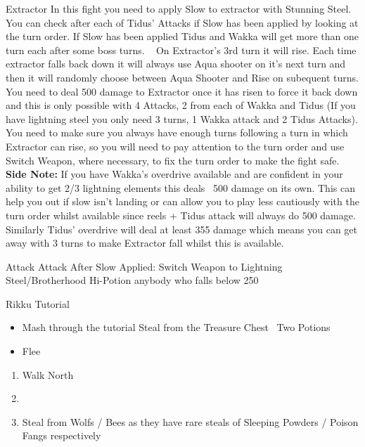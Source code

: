 \begin{battle}[4000]{Extractor}
In this fight you need to apply Slow to extractor with Stunning Steel. You can check after each of Tidus' Attacks if Slow has been applied by looking at the turn order. If Slow has been applied Tidus and Wakka will get more than one turn each after some boss turns.
\newline \ \newline
On Extractor's 3rd turn it will rise. Each time extractor falls back down it will always use Aqua shooter on it's next turn and then it will randomly choose between Aqua Shooter and Rise on subequent turns. You need to deal 500 damage to Extractor once it has risen to force it back down and this is only possible with 4 Attacks, 2 from each of Wakka and Tidus (If you have lightning steel you only need 3 turns, 1 Wakka attack and 2 Tidus Attacks). You need to make sure you always have enough turns following a turn in which Extractor can rise, so you will need to pay attention to the turn order and use Switch Weapon, where necessary, to fix the turn order to make the fight safe.
\newline \ \newline
\textbf{Side Note:} If you have Wakka's overdrive available and are confident in your ability to get 2/3 lightning elements this deals ~500 damage on its own. This can help you out if slow isn't landing or can allow you to play less cautiously with the turn order whilst available since reels + Tidus attack will always do 500 damage. Similarly Tidus' overdrive will deal at least 355 damage which means you can get away with 3 turns to make Extractor fall whilst this is available.
\newline \ \newline
	\begin{itemize}
		\tidusf Attack
		\wakkaf Attack
		\tidusf After Slow Applied: Switch Weapon to Lightning Steel/Brotherhood
		\wakkaf Hi-Potion anybody who falls below 250
	\end{itemize}
\end{battle}
\colstart
{}
\begin{battle}{Rikku Tutorial}
	\begin{itemize}
		\item Mash through the tutorial
		\rikkuf Steal from the Treasure Chest
		\rikkuf \od\ Two Potions
		\item Flee
	\end{itemize}
\end{battle}
\begin{enumerate}[resume]
	\item Walk North
	\item \formation{\tidus}{\rikku}{\auron}
	\item Steal from Wolfs / Bees as they have rare steals of Sleeping Powders / Poison Fangs respectively
\end{enumerate}